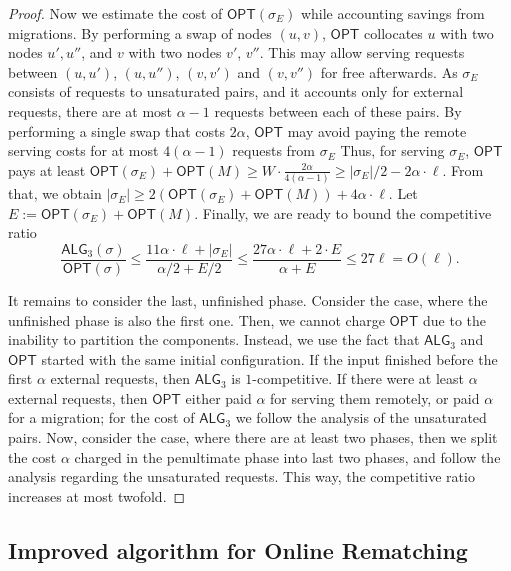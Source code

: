 \documentclass[manuscript,screen=true, review, anonymous]{acmart}
\newcommand{\OPT}{\textsf{OPT}\xspace}
\newcommand{\TAlg}{{\ensuremath{\textsf{ALG}_{3}}}\xspace}
\begin{document}
\begin{proof}
	
	Now we estimate the cost of $\OPT(\sigma_E)$ while accounting savings from migrations.
	By performing a swap of nodes $(u,v)$, $\OPT$ collocates $u$ with two nodes $u', u''$, and $v$ with two nodes $v'$, $v''$.
	This may allow serving requests between $(u,u')$, $(u,u'')$, $(v,v')$ and $(v,v'')$ for free afterwards.
	As $\sigma_E$ consists of requests to unsaturated pairs, and it accounts only for external requests, there are at most $\alpha-1$ requests between each of these pairs.
	By performing a single swap that costs $2\alpha$, $\OPT$ may avoid paying the remote serving costs for at most $4 (\alpha - 1)$ requests from $\sigma_E$
	Thus, for serving $\sigma_E$, $\OPT$ pays at least $\OPT(\sigma_E) + \OPT(M) \geq W \cdot \frac{2\alpha}{4 (\alpha-1)}\geq |\sigma_E| / 2 - 2 \alpha \cdot \ell$.
	From that, we obtain $|\sigma_E| \geq 2(\OPT(\sigma_E)+\OPT(M)) + 4\alpha \cdot \ell$.
	Let $E := \OPT(\sigma_E) + \OPT(M)$. Finally, we are ready to bound the competitive ratio
	\begin{equation*}
		\frac{\TAlg(\sigma)}{\OPT(\sigma)} \leq \frac{11\alpha \cdot \ell + |\sigma_E|}{\alpha/2 + E/2} \leq \frac{27\alpha\cdot\ell + 2\cdot E}{\alpha + E} \leq 27 \ell = O(\ell).
	\end{equation*}
	
	\medskip
	
	It remains to consider the last, unfinished phase.
	Consider the case, where the unfinished phase is also the first one.
	Then, we cannot charge $\OPT$ due to the inability to partition the components.
	Instead, we use the fact that \TAlg and $\OPT$ started with the same initial configuration.
	If the input finished before the first $\alpha$ external requests, then \TAlg is $1$-competitive.
	If there were at least $\alpha$ external requests, then $\OPT$ either paid $\alpha$ for serving them remotely, or paid $\alpha$ for a migration; for the cost of \TAlg we follow the analysis of the unsaturated pairs.
	Now, consider the case, where there are at least two phases, then we split the cost $\alpha$ charged in the penultimate phase into last two phases, and follow the analysis regarding the unsaturated requests.
	This way, the competitive ratio increases at most twofold.
\end{proof}





\subsection{Improved algorithm for Online Rematching}
\label{sec:k2}
\end{document}
